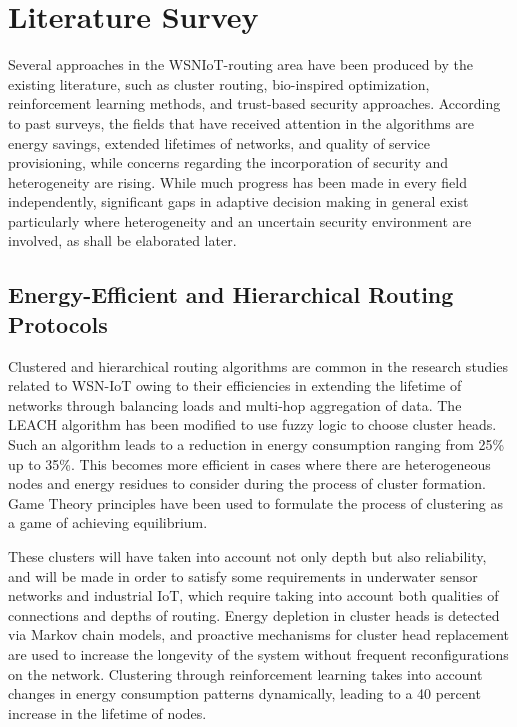 \documentclass[a4paper,fleqn]{cas-dc}
\numberwithin{equation}{section}
\begin{document}
\section{Literature Survey}
\label{sec:litsurvey}

Several approaches in the WSNIoT-routing area have been produced by the existing literature,
such as cluster routing, bio-inspired optimization, reinforcement learning methods, and trust-based
security approaches. According to past surveys, the fields that have received attention in the
algorithms are energy savings, extended lifetimes of networks, and quality of service
provisioning, while concerns regarding the incorporation of security and heterogeneity are rising.
While much progress has been made in every field independently, significant gaps in adaptive
decision making in general exist particularly where heterogeneity and an uncertain security
environment are involved, as shall be elaborated later.\cite{R22_Tiwari2025ChallengesIoTDevices}

\subsection{Energy-Efficient and Hierarchical Routing Protocols}
\label{subsec:lit_energy}

Clustered and hierarchical routing algorithms are common in the
research studies related to WSN-IoT owing to their efficiencies in
extending the lifetime of networks through balancing loads and multi-hop
aggregation of data. The LEACH algorithm has been modified to use fuzzy
logic to choose cluster heads. Such an algorithm leads to a reduction
in energy consumption ranging from 25\% up to 35\%. This becomes more
efficient in cases where there are heterogeneous nodes and energy residues
to consider during the process of cluster formation. Game Theory principles
have been used to formulate the process of clustering as a game of achieving
equilibrium.

These clusters will have taken into account not only depth
but also reliability, and will be made in order to satisfy some requirements
in underwater sensor networks and industrial IoT, which require
taking into account both qualities of connections and depths of routing.\cite{R21_Pessoa2024RITAResilientIoT,R9_Tumula2025OptimizingIoTSDNBlockchain}
Energy depletion in cluster heads is detected via Markov chain models,
and proactive mechanisms for cluster head replacement are
used to increase the longevity of the system without frequent reconfigurations
on the network. Clustering through reinforcement learning takes into account
changes in energy consumption patterns dynamically, leading to a 40 percent
increase in the lifetime of nodes.
\end{document}
